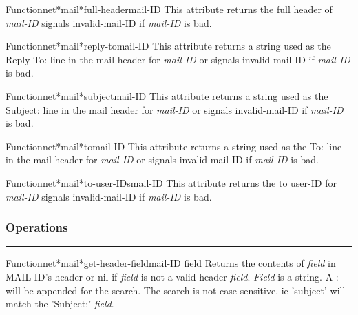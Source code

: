 \begin{functiondoc}{Function}{net*mail*full-header}{mail-ID}
This attribute returns the full header of {\em mail-ID} signals 
invalid-mail-ID if {\em mail-ID} is bad.
\end{functiondoc}

\begin{functiondoc}{Function}{net*mail*reply-to}{mail-ID}
This attribute returns a string used as the Reply-To: line in the mail header for
{\em mail-ID} or signals invalid-mail-ID if {\em mail-ID} is bad.
\end{functiondoc}

\begin{functiondoc}{Function}{net*mail*subject}{mail-ID}
This attribute returns a string used as the Subject: line in the mail header for
{\em mail-ID} or signals invalid-mail-ID if {\em mail-ID} is bad.
\end{functiondoc}

\begin{functiondoc}{Function}{net*mail*to}{mail-ID}
This attribute returns a string used as the To: line in the mail header for
{\em mail-ID} or signals invalid-mail-ID if {\em mail-ID} is bad.
\end{functiondoc}

\begin{functiondoc}{Function}{net*mail*to-user-IDs}{mail-ID}
This attribute returns the to user-ID for {\em mail-ID} signals 
invalid-mail-ID if {\em mail-ID} is bad.
\end{functiondoc}


\subsubsection*{Operations}
\par\vspace*{0.00in}\par\hrule\par\medskip\par


\begin{functiondoc}{Function}{net*mail*get-header-field}{mail-ID field}
Returns the contents of {\em field} in MAIL-ID's header or nil if {\em field} is not a valid
header {\em field}.
{\em Field} is a string.  A : will be appended for the search.  The search is not
case sensitive.  ie 'subject' will match the 'Subject:' {\em field}.
\end{functiondoc}

